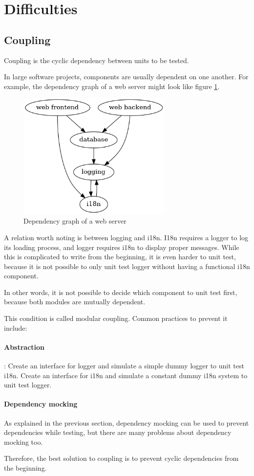 \section{Difficulties}

\subsection{Coupling}
Coupling is the cyclic dependency between units to be tested.

In large software projects, components are usually dependent on one another.
For example, the dependency graph of a web server might look like figure \ref{fig:depweb}.

\begin{figure}
	\includegraphics[width=3in]{example-deps.png}
	\caption{Dependency graph of a web server}
	\label{fig:depweb}
\end{figure}

A relation worth noting is between logging and i18n.
I18n requires a logger to log its loading process,
and logger requires i18n to display proper messages.
While this is complicated to write from the beginning,
it is even harder to unit test,
because it is not possible to only unit test logger without having a functional i18n component.

In other words, it is not possible to decide which component to unit test first,
because both modules are mutually dependent.

This condition is called modular coupling. Common practices to prevent it include:

\paragraph{Abstraction}: Create an interface for logger and simulate a simple dummy logger to unit test i18n.
Create an interface for i18n and simulate a constant dummy i18n system to unit test logger.
\paragraph{Dependency mocking}As explained in the previous section, dependency mocking can be used to prevent dependencies while testing,
but there are many problems about dependency mocking too.

Therefore, the best solution to coupling is to prevent cyclic dependencies from the beginning.
